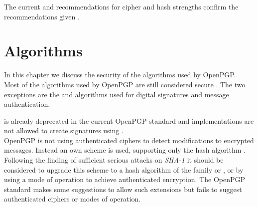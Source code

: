 The current  and  recommendations for cipher and hash strengths confirm the recommendations given \cite{keylenNIST} \cite{KeylenBSI}. 

\section{Algorithms}

In this chapter we discuss the security of the algorithms used by OpenPGP.  \\




Most of the algorithms used by OpenPGP are still considered secure \citep{TUB2015}. 
The two exceptions are the  \citep{XieLF13} and  \citep{stevens2012attacks} algorithms used for digital signatures and message authentication. 

 is already deprecated in the current OpenPGP standard \citep[section 14]{RFC4880} and implementations are not allowed to create signatures using .   \\

OpenPGP is not using authenticated ciphers to detect modifications to encrypted messages.
Instead an own scheme is used, supporting only the  hash algorithm \citep[section 5.13]{RFC4880}. 
Following the finding of sufficient serious attacks on \textit{SHA-1} \cite{stevens2012attacks} it should be considered to upgrade this scheme to a hash algorithm of the  family or , or by using a mode of operation to achieve authenticated encryption. The OpenPGP standard makes some suggestions to allow such extensions \citep[section 13.11]{RFC4880} but fails to suggest authenticated ciphers or modes of operation.




